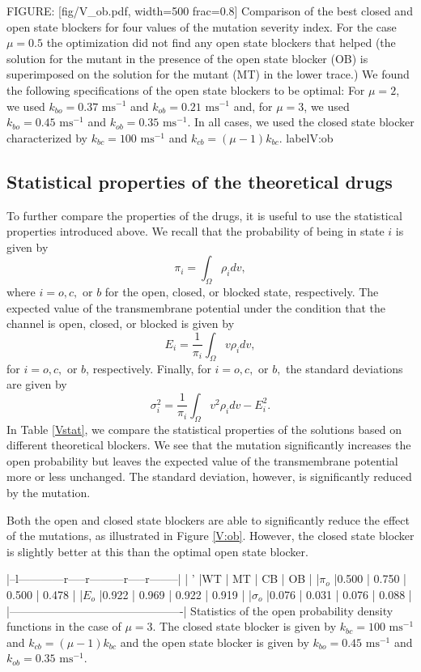 FIGURE: [fig/V_ob.pdf, width=500 frac=0.8] Comparison of the best closed and open state blockers for four values of the mutation severity index.
For the case $\mu=0.5$ the optimization did not find any open state blockers that helped (the solution for the mutant in the presence of the open state blocker (OB) is superimposed on the solution for the mutant (MT) in the lower trace.) We found the following specifications of the open state blockers to be optimal: For $\mu=2$, we used 
 $k_{bo}=0.37\text{ ms}^{-1}$ and  $k_{ob}=0.21\text{ ms}^{-1}$  and, for  $\mu=3$, we used  $k_{bo}=0.45 \text{ ms}^{-1}$ and $k_{ob}=0.35\text{ ms}^{-1}$. In all cases, we used the closed state blocker characterized by $k_{bc}=100\text{ ms}^{-1}$ and $k_{cb}=\left(  \mu-1\right)  k_{bc}$.  label{V:ob}\bigskip

\subsection{Statistical properties of the theoretical drugs}

To further compare the properties of the drugs, it is useful
to use the statistical properties introduced above. We recall that the
probability of being in state $i$ is given by
\[
\pi_{i}=\int_{\Omega}\rho_{i}dv,
\]
where $i=o,c,$ or $b$ for the open, closed, or blocked state, respectively. The expected value of the transmembrane
potential under the condition that the channel is open, closed, or blocked is
given by
\[
E_{i}=\frac{1}{\pi_{i}}\int_{\Omega}v\rho_{i}dv,
\]
for $i=o,c,$ or $b$, respectively. Finally, for $i=o,c,$ or $b,$ the standard
deviations are given by
\[
\sigma_{i}^{2}=\frac{1}{\pi_{i}}\int_{\Omega}v^{2}\rho_{i}dv-E_{i}^{2}.
\]
In Table \ref{Vstat}, we compare the statistical properties of the solutions based on
different theoretical blockers. We see that the mutation significantly increases the open probability but leaves the expected value of the transmembrane potential more or less unchanged. The standard deviation, however, is significantly reduced by the mutation.

Both the open and closed state blockers are able to significantly reduce the effect of the mutations, as illustrated in
Figure \ref{V:ob}. However, the closed state blocker is slightly better at this than the optimal open state blocker.

|--l------------r-----r---------r-----r--------|
| '         |WT    | MT    | CB    | OB        |
|$\pi_o$    |0.500 | 0.750 | 0.500 | 0.478     |
|$E_o$      |0.922 | 0.969 | 0.922 | 0.919     |
|$\sigma_o$ |0.076 | 0.031 | 0.076 | 0.088     |
|----------------------------------------------|
Statistics of the open probability density functions in the case of $\mu=3$. The closed state blocker is given by
$k_{bc}=100\text{ ms}^{-1}$ and $k_{cb}=\left(  \mu-1\right)  k_{bc}$ and the open state blocker is given by $k_{bo}=0.45\text{ ms}^{-1}$ and $k_{ob}=0.35\text{ ms}^{-1}$.  \label{Vstat}





